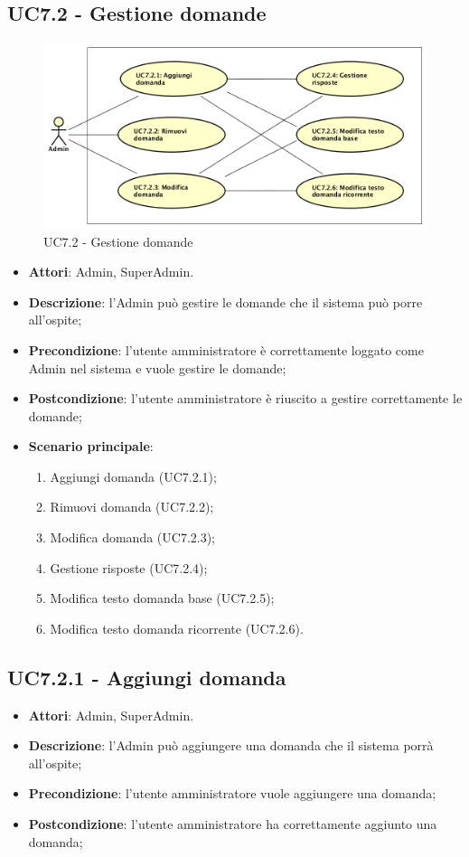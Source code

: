\documentclass[../AnalisiDeiRequisiti.tex]{subfiles}
\begin{document}
\subsection{UC7.2 - Gestione domande} 
\label{sssec:UC7.2} 
\begin{figure}[!h]
	\centering
	\includegraphics[width=\textwidth]{UseCases/UC7_GestionePannelloAdmin/UC7_2_GestioneDomande/UC7_2_GestioneDomande.png}
	\caption{UC7.2 - Gestione domande}
\end{figure}
\begin{itemize} 
\item \textbf{Attori}: Admin, SuperAdmin.
\item \textbf{Descrizione}: l'Admin può gestire le domande che il sistema può porre all'ospite;
\item \textbf{Precondizione}: l'utente amministratore è correttamente loggato come Admin nel sistema e vuole gestire le domande;
\item \textbf{Postcondizione}: l'utente amministratore è riuscito a gestire correttamente le domande;
\item \textbf{Scenario principale}: \begin{enumerate}\item Aggiungi domanda (UC7.2.1);\item Rimuovi domanda (UC7.2.2);\item Modifica domanda (UC7.2.3);\item Gestione risposte (UC7.2.4);\item Modifica testo domanda base (UC7.2.5);\item Modifica testo domanda ricorrente (UC7.2.6). 
 \end{enumerate}
\end{itemize} 
\subsection{UC7.2.1 - Aggiungi domanda} 
\label{sssec:UC7.2.1} 
\begin{itemize} 
\item \textbf{Attori}: Admin, SuperAdmin.
\item \textbf{Descrizione}: l'Admin può aggiungere una domanda che il sistema porrà all'ospite;
\item \textbf{Precondizione}: l'utente amministratore vuole aggiungere una domanda;
\item \textbf{Postcondizione}: l'utente amministratore ha correttamente aggiunto una domanda;
\end{itemize} 
\end{document}
